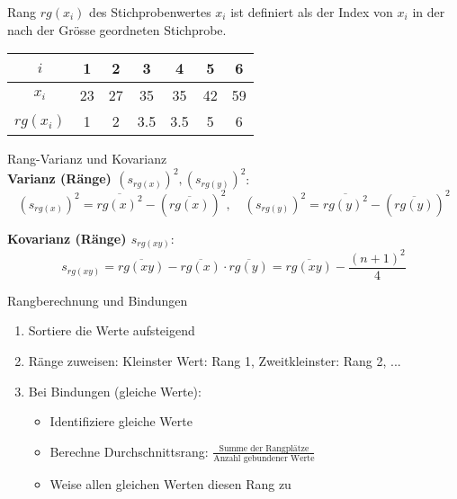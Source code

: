 \begin{definition}{Rang}
$rg(x_i)$ des Stichprobenwertes $x_i$ ist definiert als der Index von $x_i$ in der nach der Grösse geordneten Stichprobe.
\vspace{-4mm}\\
\begin{center}
\begin{tabular}{|c|c|c|c|c|c|c|}
\hline
$i$ & 1 & 2 & 3 & 4 & 5 & 6 \\
\hline
$x_i$ & 23 & 27 & 35 & 35 & 42 & 59 \\
\hline
$rg(x_i)$ & 1 & 2 & 3.5 & 3.5 & 5 & 6 \\
\hline
\end{tabular}
\end{center}
\end{definition}

\begin{corollary}{Rang-Varianz und Kovarianz}\\
\textbf{Varianz (Ränge) $(s_{rg(x)})^2, (s_{rg(y)})^2$}:
\vspace{-1mm}\\
$$(s_{rg(x)})^2 = \overline{rg(x)^2} - (\overline{rg(x)})^2, \quad (s_{rg(y)})^2 = \overline{rg(y)^2} - (\overline{rg(y)})^2$$

\textbf{Kovarianz (Ränge) $s_{rg(xy)}$}:
\vspace{-2mm}\\
$$s_{rg(xy)} = \overline{rg(xy)} - \overline{rg(x)} \cdot \overline{rg(y)} = \overline{rg(xy)} - \frac{(n+1)^2}{4}$$
\end{corollary}

\begin{KR}{Rangberechnung und Bindungen}
\begin{enumerate}
    \item Sortiere die Werte aufsteigend
    \item Ränge zuweisen: Kleinster Wert: Rang 1, Zweitkleinster: Rang 2, ...
    \item Bei Bindungen (gleiche Werte):
        \begin{itemize}
            \item Identifiziere gleiche Werte
            \item Berechne Durchschnittsrang: $\frac{\text{Summe der Rangplätze}}{\text{Anzahl gebundener Werte}}$
            \item Weise allen gleichen Werten diesen Rang zu
        \end{itemize}
\end{enumerate}
\end{KR}

